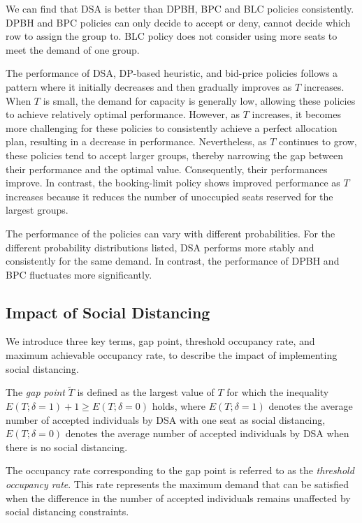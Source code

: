 We can find that DSA is better than DPBH, BPC and BLC policies consistently. DPBH and BPC policies can only decide to accept or deny, cannot decide which row to assign the group to. BLC policy does not consider using more seats to meet the demand of one group.

The performance of DSA, DP-based heuristic, and bid-price policies follows a pattern where it initially decreases and then gradually improves as $T$ increases. When $T$ is small, the demand for capacity is generally low, allowing these policies to achieve relatively optimal performance. However, as $T$ increases, it becomes more challenging for these policies to consistently achieve a perfect allocation plan, resulting in a decrease in performance. Nevertheless, as $T$ continues to grow, these policies tend to accept larger groups, thereby narrowing the gap between their performance and the optimal value. Consequently, their performances improve. In contrast, the booking-limit policy shows improved performance as $T$ increases because it reduces the number of unoccupied seats reserved for the largest groups. 

The performance of the policies can vary with different probabilities. For the different probability distributions listed, DSA performs more stably and consistently for the same demand. In contrast, the performance of DPBH and BPC fluctuates more significantly.


\subsection{Impact of Social Distancing}\label{impact_sd}
We introduce three key terms, gap point, threshold occupancy rate, and maximum achievable occupancy rate, to describe the impact of implementing social distancing.

The \textit{gap point} $\tilde{T}$ is defined as the largest value of $T$ for which the inequality $E(T; \delta =1)+1 \geq E(T; \delta = 0)$ holds, where $E(T; \delta =1)$ denotes the average number of accepted individuals by DSA with one seat as social distancing, $E(T; \delta = 0)$ denotes the average number of accepted individuals by DSA when there is no social distancing.

The occupancy rate corresponding to the gap point is referred to as the \textit{threshold occupancy rate}. This rate represents the maximum demand that can be satisfied when the difference in the number of accepted individuals remains unaffected by social distancing constraints.

